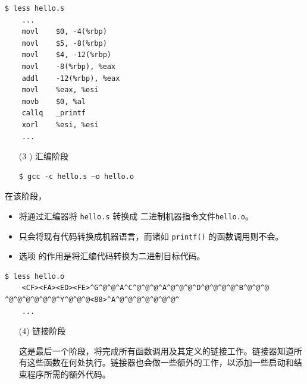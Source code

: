 \begin{frame}[fragile]\ft{\secname}
  \begin{lstlisting}[basicstyle=\ttfamily\footnotesize,backgroundcolor=\color{red!10}]
    $ less hello.s
    ...
    movl    $0, -4(%rbp)
    movl    $5, -8(%rbp)
    movl    $4, -12(%rbp)
    movl    -8(%rbp), %eax
    addl    -12(%rbp), %eax
    movl    %eax, %esi
    movb    $0, %al
    callq   _printf
    xorl    %esi, %esi
    ...      
  \end{lstlisting}
\end{frame}


\begin{frame}[fragile]\ft{\secname}
  \begin{itemize}
  \item[(3 )] 汇编阶段
\begin{lstlisting}[backgroundcolor=\color{red!10}]
$ gcc -c hello.s –o hello.o
\end{lstlisting}   
\end{itemize}

在该阶段，
\begin{itemize}
\item 将通过汇编器将 \lstinline|hello.s| 转换成  二进制机器指令文件\lstinline|hello.o|。
\item 只会将现有代码转换成机器语言，而诸如 \lstinline|printf()| 的函数调用则不会。
\item 选项  的作用是将汇编代码转换为二进制目标代码。
\end{itemize}
\end{frame}


\begin{frame}[fragile]\ft{\secname}
  \begin{lstlisting}[backgroundcolor=\color{red!10}]
    $ less hello.o
    <CF><FA><ED><FE>^G^@^@^A^C^@^@^@^A^@^@^@^D^@^@^@^@^B^@^@^@ ^@^@^@^@^@^@^Y^@^@^@<88>^A^@^@^@^@^@^@^@^
    ...      
  \end{lstlisting}

\end{frame}


\begin{frame}[fragile]\ft{\secname}
  \begin{itemize}
  \item[(4)] 链接阶段
  \item[] 
    这是最后一个阶段，将完成所有函数调用及其定义的链接工作。链接器知道所有这些函数在何处执行。链接器也会做一些额外的工作，以添加一些启动和结束程序所需的额外代码。 
  \end{itemize}
\end{frame}


